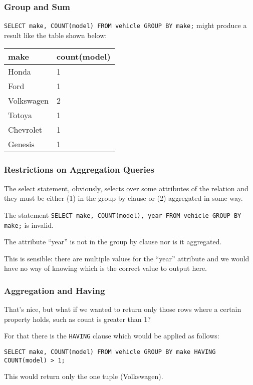 \begin{frame}
\frametitle{Group and Sum}

\texttt{SELECT make, COUNT(model) FROM vehicle GROUP BY make;} might produce a result like the table shown below:

\begin{center}
\begin{tabular}{|l|l|}\hline
	\textbf{make} & \textbf{count(model)} \\ \hline
	Honda & 1  \\ \hline
	Ford & 1  \\ \hline
	Volkswagen & 2  \\ \hline
	Totoya & 1  \\ \hline
	Chevrolet & 1  \\ \hline
	Genesis & 1  \\ \hline
\end{tabular}
\end{center}

\end{frame}



\begin{frame}
\frametitle{Restrictions on Aggregation Queries}

The select statement, obviously, selects over some attributes of the relation and they must be either (1) in the group by clause or (2) aggregated in some way. 

The statement \texttt{SELECT make, COUNT(model), year FROM vehicle GROUP BY make;} is invalid.

The attribute ``year'' is not in the group by clause nor is it aggregated. 

This is sensible: there are multiple values for the ``year'' attribute and we would have no way of knowing which is the correct value to output here.

\end{frame}


\begin{frame}
\frametitle{Aggregation and Having}

That's nice, but what if we wanted to return only those rows where a certain property holds, such as count is greater than 1? 

For that there is the \texttt{HAVING} clause which would be applied as follows: 

\texttt{SELECT make, COUNT(model) FROM vehicle GROUP BY make HAVING COUNT(model) > 1;} 

This would return only the one tuple (Volkswagen).

\end{frame}



